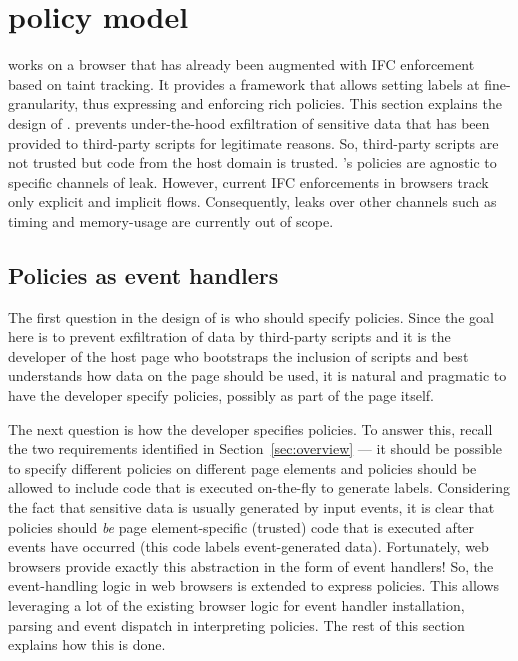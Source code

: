 \lstset{language=HTML}

\section{{\sys} policy model}
\label{sec:model}
{\sys} works on a browser that has already been augmented with IFC
enforcement based on taint tracking.
It provides a framework that allows setting labels at
fine-granularity, thus expressing and enforcing rich policies. This
section explains the design of {\sys}. {\sys} prevents under-the-hood
exfiltration of sensitive data that has been provided to third-party
scripts for legitimate reasons. So, third-party scripts are not
trusted but code from the host domain is trusted.
{\sys}'s policies are agnostic to specific channels of leak.  However, 
current IFC enforcements in browsers track only explicit and implicit 
flows. Consequently, leaks over other channels such as timing and
memory-usage are currently out of scope. %

\subsection{Policies as event handlers}

The first question in the design of {\sys} is who should specify
policies. Since the goal here is to prevent exfiltration of data by
third-party scripts and it is the developer of the host page who
bootstraps the inclusion of scripts and best understands how data on
the page should be used, it is natural and pragmatic to have the
developer specify policies, possibly as part of the page itself.

The next question is how the developer specifies policies. To answer
this, recall the two requirements identified in
Section~\ref{sec:overview} --- it should be possible to specify
different policies on different page elements and policies should be
allowed to include code that is executed on-the-fly to generate
labels. Considering the fact that sensitive data is usually
generated by input events, it is clear that policies should \emph{be}
page element-specific (trusted) code that is executed after events
have occurred (this code labels event-generated data). Fortunately,
web browsers provide exactly this abstraction in the form of event
handlers! So, the event-handling logic in web browsers is extended to
express {\sys} policies. This allows leveraging a lot of the existing
browser logic for event handler installation, parsing and event
dispatch in interpreting policies. The rest of this section explains
how this is done. 

